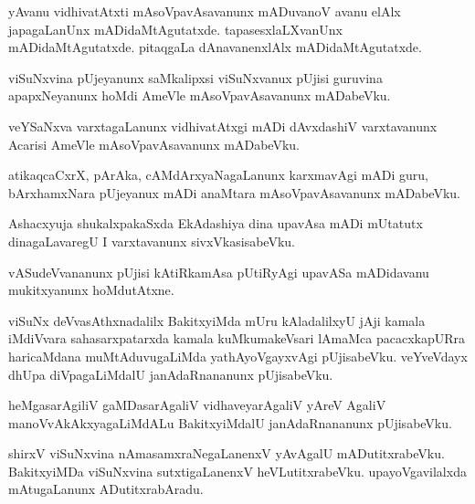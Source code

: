 \documentclass{article}
\begin{document}
\begin{mn}%
yAvanu vidhivatAtxti mAsoVpavAsavanunx mADuvanoV avanu elAlx japagaLanUnx mADidaMtAgutatxde. 
tapasesxlaLXvanUnx mADidaMtAgutatxde. pitaqgaLa dAnavanenxlAlx mADidaMtAgutatxde.
\end{mn}

\begin{mn}%
viSuNxvina pUjeyanunx saMkalipxsi viSuNxvanux pUjisi guruvina apapxNeyanunx hoMdi AmeVle 
mAsoVpavAsavanunx mADabeVku.
\end{mn}

\begin{mn}%
veYSaNxva varxtagaLanunx vidhivatAtxgi mADi dAvxdashiV varxtavanunx Acarisi AmeVle 
mAsoVpavAsavanunx mADabeVku.
\end{mn}

\begin{mn}%
atikaqcaCxrX, pArAka, cAMdArxyaNagaLanunx karxmavAgi mADi guru, bArxhamxNara pUjeyanux mADi 
anaMtara mAsoVpavAsavanunx mADabeVku.
\end{mn}

\begin{mn}%
Ashacxyuja shukalxpakaSxda EkAdashiya dina upavAsa mADi mUtatutx dinagaLavaregU I varxtavanunx 
sivxVkasisabeVku.
\end{mn}

\begin{mn}%
vASudeVvananunx pUjisi kAtiRkamAsa pUtiRyAgi upavASa mADidavanu mukitxyanunx hoMdutAtxne.
\end{mn}

\begin{mn}%
viSuNx deVvasAthxnadalilx BakitxyiMda mUru kAladalilxyU jAji kamala iMdiVvara sahasarxpatarxda 
kamala kuMkumakeVsari lAmaMca pacacxkapURra haricaMdana muMtAduvugaLiMda yathAyoVgayxvAgi 
pUjisabeVku. veYveVdayx dhUpa diVpagaLiMdalU janAdaRnananunx pUjisabeVku.
\end{mn}

\begin{mn}%
heMgasarAgiliV gaMDasarAgaliV vidhaveyarAgaliV yAreV AgaliV manoVvAkAkxyagaLiMdALu BakitxyiMdalU 
janAdaRnananunx pUjisabeVku.
\end{mn}

\begin{mn}%
shirxV viSuNxvina nAmasamxraNegaLanenxV yAvAgalU mADutitxrabeVku. BakitxyiMDa viSuNxvina 
sutxtigaLanenxV heVLutitxrabeVku. upayoVgavilalxda mAtugaLanunx ADutitxrabAradu.
\end{mn}
\end{document}
